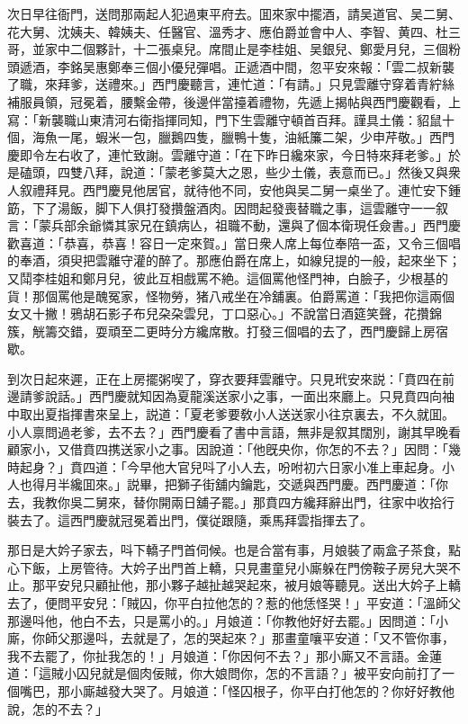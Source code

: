 次日早往衙門，送問那兩起人犯過東平府去。囬來家中擺酒，請吴道官、吴二舅、花大舅、沈姨夫、韓姨夫、任醫官、溫秀才、應伯爵並會中人、李智、黄四、杜三哥，並家中二個夥計，十二張桌兒。席間止是李桂姐、吴銀兒、鄭愛月兒，三個粉頭遞酒，李銘吴惠鄭奉三個小優兒彈唱。正遞酒中間，忽平安來報：「雲二叔新襲了職，來拜爹，送禮來。」西門慶聽言，連忙道：「有請。」只見雲離守穿着青紵絲補服員領，冠冕着，腰繫金帶，後邊伴當擡着禮物，先遞上揭帖與西門慶觀看，上寫：「新襲職山東清河右衛指揮同知，門下生雲離守頓首百拜。謹具土儀：貂鼠十個，海魚一尾，蝦米一包，臘鵝四隻，臘鴨十隻，油紙簾二架，少申芹敬。」西門慶即令左右收了，連忙致謝。雲離守道：「在下昨日纔來家，今日特來拜老爹。」於是磕頭，四雙八拜，說道：「蒙老爹莫大之恩，些少土儀，表意而已。」然後又與衆人叙禮拜見。西門慶見他居官，就待他不同，安他與吴二舅一桌坐了。連忙安下鍾筯，下了湯飯，脚下人俱打發攢盤酒肉。因問起發喪替職之事，這雲離守一一叙言：「蒙兵部余爺憐其家兄在鎮病亾，祖職不動，還與了個本衛現任僉書。」西門慶歡喜道：「恭喜，恭喜！容日一定來賀。」當日衆人席上每位奉陪一盃，又令三個唱的奉酒，須臾把雲離守灌的醉了。那應伯爵在席上，如線兒提的一般，起來坐下；又鬦李桂姐和鄭月兒，彼此互相戲罵不絶。這個罵他怪門神，白臉子，少根基的貨！那個罵他是醜冤家，怪物勞，猪八戒坐在冷舖裏。伯爵罵道：「我把你這兩個女又十撇！鴉胡石影子布兒朶朶雲兒，丁口惡心。」不說當日酒筵笑聲，花攢錦簇，觥籌交錯，耍頑至二更時分方纔席散。打發三個唱的去了，西門慶歸上房宿歇。

到次日起來遲，正在上房擺粥喫了，穿衣要拜雲離守。只見玳安來説：「賁四在前邊請爹說話。」西門慶就知因為夏龍溪送家小之事，一面出來廳上。只見賁四向袖中取出夏指揮書來呈上，説道：「夏老爹要敎小人送送家小往京裏去，不久就囬。小人禀問過老爹，去不去？」西門慶看了書中言語，無非是叙其闊別，謝其早晚看顧家小，又借賁四携送家小之事。因說道：「他旣央你，你怎的不去？」因問：「幾時起身？」賁四道：「今早他大官兒呌了小人去，吩咐初六日家小准上車起身。小人也得月半纔囬來。」説畢，把獅子街舖内鑰匙，交遞與西門慶。西門慶道：「你去，我教你吳二舅來，替你開兩日舖子罷。」那賁四方纔拜辭出門，往家中收拾行裝去了。這西門慶就冠冕着出門，僕従跟隨，乘馬拜雲指揮去了。

那日是大妗子家去，呌下轎子門首伺候。也是合當有事，月娘裝了兩盒子茶食，點心下飯，上房管待。大妗子出門首上轎，只見畫童兒小廝躲在門傍鞍子房兒大哭不止。那平安兒只顧扯他，那小夥子越扯越哭起來，被月娘等聽見。送出大妗子上轎去了，便問平安兒：「賊囚，你平白拉他怎的？惹的他恁怪哭！」平安道：「溫師父那邊呌他，他白不去，只是罵小的。」月娘道：「你教他好好去罷。」因問道：「小廝，你師父那邊呌，去就是了，怎的哭起來？」那畫童嚷平安道：「又不管你事，我不去罷了，你扯我怎的！」月娘道：「你因何不去？」那小廝又不言語。金蓮道：「這賊小囚兒就是個肉佞賊，你大娘問你，怎的不言語？」被平安向前打了一個嘴巴，那小廝越發大哭了。月娘道：「怪囚根子，你平白打他怎的？你好好教他說，怎的不去？」

